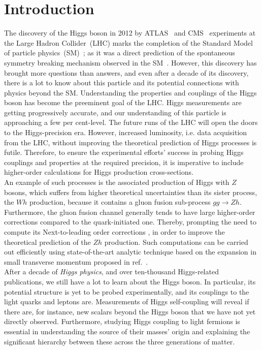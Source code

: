 

\chapter{Introduction}
The discovery of the Higgs boson in 2012 by ATLAS~\cite{ATLAS:2012yve}  and CMS~\cite{CMS:2012qbp} experiments at the {L}arge {H}adron {C}ollider~(LHC) marks the completion of the Standard Model of particle physics~(SM)~\cite{salam1,salam2,PhysRevLett.19.1264}; as it was a direct prediction of the spontaneous symmetry breaking mechanism observed in the SM~\cite{PhysRevLett.13.321,PhysRevLett.13.508,HIGGS1964132,PhysRevLett.13.585,Guralnik:2009jd}. However, this discovery has brought more questions than answers, and even after a decade of its discovery, there is a lot to know about this particle and its potential connections with physics beyond the SM.
%
Understanding the properties and couplings of the Higgs boson has become the preeminent goal of the LHC. Higgs measurements are getting progressively accurate, and our understanding of this particle is approaching a few per cent-level. The future runs of the LHC will open the doors to the Higgs-precision era. However, increased luminosity, i.e. data acquisition from the LHC, without improving the theoretical prediction of Higgs processes is futile. Therefore, to ensure the experimental efforts' success in probing Higgs couplings and properties at the required precision, it is imperative to include higher-order calculations for Higgs production cross-sections. \\ 
An example of such processes is the associated production of Higgs with $Z$ bosons, which suffers from higher theoretical uncertainties than its sister process, the $Wh$ production, because it contains a gluon fusion sub-process $ gg \to Zh$. Furthermore, the gluon fusion channel generally tends to have large higher-order corrections compared to the quark-initiated one.  Thereby, prompting the need to compute its Next-to-leading order corrections , in order to improve the theoretical prediction of the $Zh$ production. Such computations can be carried out efficiently using state-of-the-art analytic technique based on the expansion in small transverse momentum proposed in ref.~\cite{Bonciani:2018omm}. 
%
\\ After a decade of \emph{Higgs physics}, and over ten-thousand Higgs-related publications, we still have a lot to learn about the Higgs boson.  In particular, its potential structure is yet to be probed experimentally, and its couplings to the light quarks and leptons are. Measurements of Higgs self-coupling will reveal if there are, for instance, new scalars beyond the Higgs boson that we have not yet directly observed. Furthermore, studying Higgs coupling to light fermions is essential in understanding the source of their masses' origin and explaining the significant hierarchy between these across the three generations of matter. \\ 
